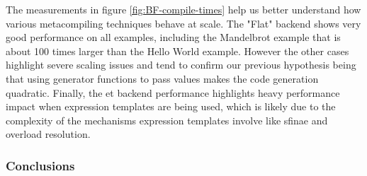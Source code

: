 \documentclass[../main]{subfiles}
\begin{document}
The measurements in figure \ref{fig:BF-compile-times} help us better understand
how various metacompiling techniques behave at scale. The "Flat" backend shows
very good performance on all examples, including the Mandelbrot example that is
about 100 times larger than the Hello World example. However the other cases
highlight severe scaling issues and tend to confirm our previous hypothesis
being that using generator functions to pass values makes the code generation
quadratic. Finally, the \gls{et} backend performance highlights
heavy performance impact when expression templates are being used, which is
likely due to the complexity of the mechanisms expression templates involve like
\gls{sfinae} and overload resolution.

\subsubsection{
  Conclusions
}
\end{document}
